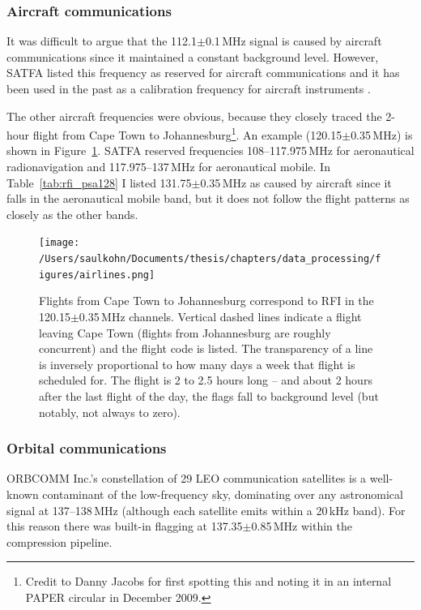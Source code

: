 \subsubsection*{Aircraft communications}
It was difficult to argue that the 112.1$\pm$0.1\,MHz signal is caused by aircraft communications since it maintained a constant background level. However, SATFA listed this frequency as reserved for aircraft communications and it has been used in the past as a calibration frequency for aircraft instruments \cite{AircraftCalibrationFreqs}.

The other aircraft frequencies were obvious, because they closely traced the 2-hour flight from Cape Town to Johannesburg\footnote{Credit to Danny Jacobs for first spotting this and noting it in an internal PAPER circular in December 2009.}. 
An example (120.15$\pm$0.35\,MHz) is shown in Figure~\ref{fig:rfi_psa128_aircraft}. SATFA reserved frequencies 108--117.975\,MHz for aeronautical radionavigation and 117.975--137\,MHz for aeronautical mobile. In Table~\ref{tab:rfi_psa128} I listed 131.75$\pm$0.35\,MHz as caused by aircraft since it falls in the aeronautical mobile band, but it does not follow the flight patterns as closely as the other bands.

\begin{figure}[h!]
\centering
\texttt{[image: /Users/saulkohn/Documents/thesis/chapters/data\_processing/figures/airlines.png]}
\caption[Flights from Cape Town to Johannesburg correspond to RFI.]{
Flights from Cape Town to Johannesburg correspond to RFI in the 120.15$\pm$0.35\,MHz channels. Vertical dashed lines indicate a flight leaving Cape Town (flights from Johannesburg are roughly concurrent) and the flight code is listed. The transparency of a line is inversely proportional to how many days a week that flight is scheduled for. The flight is 2 to 2.5 hours long -- and about 2 hours after the last flight of the day, the flags fall to background level (but notably, not always to zero).}
\label{fig:rfi_psa128_aircraft}
\end{figure} 

\subsubsection*{Orbital communications}
ORBCOMM Inc.'s constellation of 29 LEO communication satellites is a well-known contaminant of the low-frequency sky, dominating over any astronomical signal at 137--138\,MHz (although each satellite emits within a 20\,kHz band). For this reason there was built-in flagging at 137.35$\pm$0.85\,MHz within the compression pipeline.

